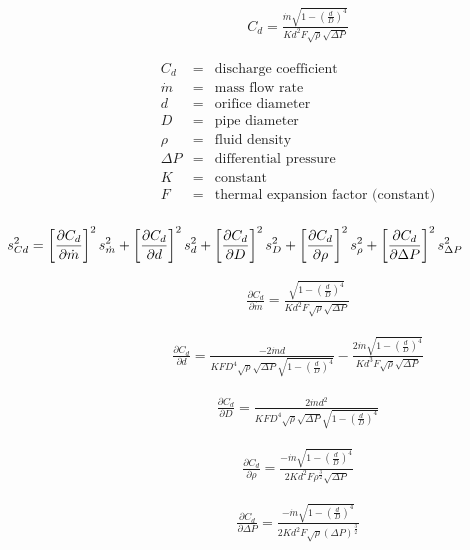 \documentclass[12pt]{article}
\begin{document}
\pagestyle{empty}
\Large
{}
\pagecolor{ehandbook}
\Large


\begin{eqnarray*}
C_d = \frac{\dot{m} \sqrt{1-\left( \frac{d}{D} \right) ^4}}{K d^2 F \sqrt{\rho} \sqrt{\Delta P}}
\end{eqnarray*}

\begin{eqnarray*}
C_d       &=& \mbox{discharge coefficient} \\
\dot{m} &=& \mbox{mass flow rate} \\ 
d          &=& \mbox{orifice diameter} \\
D         &=& \mbox{pipe diameter} \\
\rho      &=& \mbox{fluid density} \\
\Delta P &=& \mbox{differential pressure} \\
K          &=& \mbox{constant} \\
F          &=& \mbox{thermal expansion factor (constant)} \\
\end{eqnarray*}

\begin{eqnarray*}
\hspace*{-1.25in}
s^2_{Cd} = \left[ \frac{\partial C_d}{\partial \dot{m}} \right]^2 s^2_{\dot m} +
                  \left[ \frac{\partial C_d}{\partial d} \right]^2 s^2_d +
                  \left[ \frac{\partial C_d}{\partial D} \right]^2 s^2_D +
                 \left[ \frac{\partial C_d}{\partial \rho} \right]^2 s^2_{\rho} +
                 \left[ \frac{\partial C_d}{\partial \Delta P} \right]^2 s^2_{\Delta P} 
\end{eqnarray*}

\begin{eqnarray*}
\frac{\partial C_d}{\partial \dot{m}} = 
      \frac{\sqrt{1-\left( \frac{d}{D} \right) ^4}}{K d^2 F \sqrt{\rho} \sqrt{\Delta P}}
\end{eqnarray*}

\begin{eqnarray*}
\frac{\partial C_d}{\partial d} = 
      \frac{-2\dot{m} d}{K F D^4 \sqrt{\rho} \sqrt{\Delta P} \sqrt{1-\left( \frac{d}{D} \right) ^4}} - 
      \frac{2 \dot{m} \sqrt{1-\left( \frac{d}{D} \right) ^4}}{K d^3 F \sqrt{\rho} \sqrt{\Delta P}}
\end{eqnarray*}

\begin{eqnarray*}
\frac{\partial C_d}{\partial D} =   
      \frac{2 \dot{m} d^2}{K F D^4 \sqrt{\rho} \sqrt{\Delta P} \sqrt{1-\left( \frac{d}{D} \right) ^4}}
\end{eqnarray*}

\begin{eqnarray*}
\frac{\partial C_d}{\partial \rho} =
        \frac{- \dot{m} \sqrt{1-\left( \frac{d}{D} \right) ^4}}{2 K d^2 F \rho^{\frac{3}{2}} \sqrt{\Delta P}}
\end{eqnarray*}

\begin{eqnarray*}
\frac{\partial C_d}{\partial \Delta P} =
      \frac{- \dot{m} \sqrt{1-\left( \frac{d}{D} \right) ^4}}{2 K d^2 F \sqrt{\rho} (\Delta P)^{\frac{3}{2}}}
\end{eqnarray*}
\end{document}
